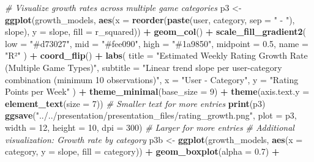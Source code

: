 \documentclass[
]{article}
\newenvironment{Shaded}{\begin{snugshade}}{\end{snugshade}}
\newcommand{\AttributeTok}[1]{\textcolor[rgb]{0.13,0.29,0.53}{#1}}
\newcommand{\CommentTok}[1]{\textcolor[rgb]{0.56,0.35,0.01}{\textit{#1}}}
\newcommand{\DecValTok}[1]{\textcolor[rgb]{0.00,0.00,0.81}{#1}}
\newcommand{\FloatTok}[1]{\textcolor[rgb]{0.00,0.00,0.81}{#1}}
\newcommand{\FunctionTok}[1]{\textcolor[rgb]{0.13,0.29,0.53}{\textbf{#1}}}
\newcommand{\NormalTok}[1]{#1}
\newcommand{\OtherTok}[1]{\textcolor[rgb]{0.56,0.35,0.01}{#1}}
\newcommand{\SpecialCharTok}[1]{\textcolor[rgb]{0.81,0.36,0.00}{\textbf{#1}}}
\newcommand{\StringTok}[1]{\textcolor[rgb]{0.31,0.60,0.02}{#1}}
\begin{document}
\begin{Shaded}
\begin{Highlighting}[]
    \CommentTok{\# Visualize growth rates across multiple game categories}
\NormalTok{    p3 }\OtherTok{\textless{}{-}} \FunctionTok{ggplot}\NormalTok{(growth\_models, }\FunctionTok{aes}\NormalTok{(}\AttributeTok{x =} \FunctionTok{reorder}\NormalTok{(}\FunctionTok{paste}\NormalTok{(user, category, }\AttributeTok{sep =} \StringTok{" {-} "}\NormalTok{), slope), }\AttributeTok{y =}\NormalTok{ slope, }\AttributeTok{fill =}\NormalTok{ r\_squared)) }\SpecialCharTok{+}
        \FunctionTok{geom\_col}\NormalTok{() }\SpecialCharTok{+}
        \FunctionTok{scale\_fill\_gradient2}\NormalTok{(}
            \AttributeTok{low =} \StringTok{"\#d73027"}\NormalTok{, }\AttributeTok{mid =} \StringTok{"\#fee090"}\NormalTok{, }\AttributeTok{high =} \StringTok{"\#1a9850"}\NormalTok{,}
            \AttributeTok{midpoint =} \FloatTok{0.5}\NormalTok{, }\AttributeTok{name =} \StringTok{"R²"}
\NormalTok{        ) }\SpecialCharTok{+}
        \FunctionTok{coord\_flip}\NormalTok{() }\SpecialCharTok{+}
        \FunctionTok{labs}\NormalTok{(}
            \AttributeTok{title =} \StringTok{"Estimated Weekly Rating Growth Rate (Multiple Game Types)"}\NormalTok{,}
            \AttributeTok{subtitle =} \StringTok{"Linear trend slope per user{-}category combination (minimum 10 observations)"}\NormalTok{,}
            \AttributeTok{x =} \StringTok{"User {-} Category"}\NormalTok{,}
            \AttributeTok{y =} \StringTok{"Rating Points per Week"}
\NormalTok{        ) }\SpecialCharTok{+}
        \FunctionTok{theme\_minimal}\NormalTok{(}\AttributeTok{base\_size =} \DecValTok{9}\NormalTok{) }\SpecialCharTok{+}
            \FunctionTok{theme}\NormalTok{(}\AttributeTok{axis.text.y =} \FunctionTok{element\_text}\NormalTok{(}\AttributeTok{size =} \DecValTok{7}\NormalTok{)) }\CommentTok{\# Smaller text for more entries}
    \FunctionTok{print}\NormalTok{(p3)}
    \FunctionTok{ggsave}\NormalTok{(}\StringTok{"../../presentation/presentation\_files/rating\_growth.png"}\NormalTok{, }\AttributeTok{plot =}\NormalTok{ p3, }\AttributeTok{width =} \DecValTok{12}\NormalTok{, }\AttributeTok{height =} \DecValTok{10}\NormalTok{, }\AttributeTok{dpi =} \DecValTok{300}\NormalTok{) }\CommentTok{\# Larger for more entries}
    \CommentTok{\# Additional visualization: Growth rate by category}
\NormalTok{    p3b }\OtherTok{\textless{}{-}} \FunctionTok{ggplot}\NormalTok{(growth\_models, }\FunctionTok{aes}\NormalTok{(}\AttributeTok{x =}\NormalTok{ category, }\AttributeTok{y =}\NormalTok{ slope, }\AttributeTok{fill =}\NormalTok{ category)) }\SpecialCharTok{+}
        \FunctionTok{geom\_boxplot}\NormalTok{(}\AttributeTok{alpha =} \FloatTok{0.7}\NormalTok{) }\SpecialCharTok{+}

\end{Highlighting}
\end{Shaded}
\end{document}
